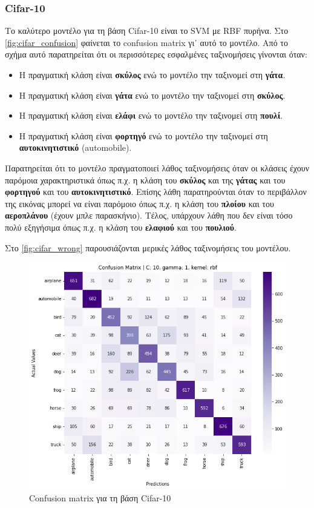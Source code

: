 \documentclass[a4paper]{article}
\begin{document}
\subsubsection{Cifar-10}

Το καλύτερο μοντέλο για τη βάση Cifar-10 είναι το SVM με RBF πυρήνα. Στο
\autoref{fig:cifar_confusion} φαίνεται το confusion matrix γι᾽ αυτό το μοντέλο.
Από το σχήμα αυτό παρατηρείται ότι οι περισσότερες εσφαλμένες ταξινομήσεις
γίνονται όταν:

\begin{itemize}
    \item Η πραγματική κλάση είναι {\bf σκύλος} ενώ το μοντέλο την ταξινομεί στη
        {\bf γάτα}.
    \item Η πραγματική κλάση είναι {\bf γάτα} ενώ το μοντέλο την ταξινομεί στη
        {\bf σκύλος}.
    \item Η πραγματική κλάση είναι {\bf ελάφι} ενώ το μοντέλο την ταξινομεί στη
        {\bf πουλί}.
    \item Η πραγματική κλάση είναι {\bf φορτηγό} ενώ το μοντέλο την ταξινομεί στη
        {\bf αυτοκινητιστικό} (automobile).
\end{itemize}

Παρατηρείται ότι το μοντέλο πραγματοποιεί λάθος ταξινομήσεις όταν οι κλάσεις
έχουν παρόμοια χαρακτηριστικά όπως π.χ. η κλάση του {\bf σκύλος} και της {\bf
γάτας} και του {\bf φορτηγού} και του {\bf αυτοκινητιστικό}. Επίσης λάθη
παρατηρούνται όταν το περιβάλλον της εικόνας μπορεί να είναι παρόμοιο όπως π.χ.
η κλάση του {\bf πλοίου} και του {\bf αεροπλάνου} (έχουν μπλε παρασκήνιο).
Τέλος, υπάρχουν λάθη που δεν είναι τόσο πολύ εξηγήσιμα όπως π.χ. η κλάση του
{\bf ελαφιού} και του {\bf πουλιού}.

Στο \autoref{fig:cifar_wrong} παρουσιάζονται μερικές λάθος ταξινομήσεις του
μοντέλου.

\begin{figure}[H]
    \centering
    \includegraphics[width=0.6\linewidth]{figures/cifar/confusion_matrix.png}
    \caption{Confusion matrix για τη βάση Cifar-10}
    \label{fig:cifar_confusion}
\end{figure}
\end{document}
